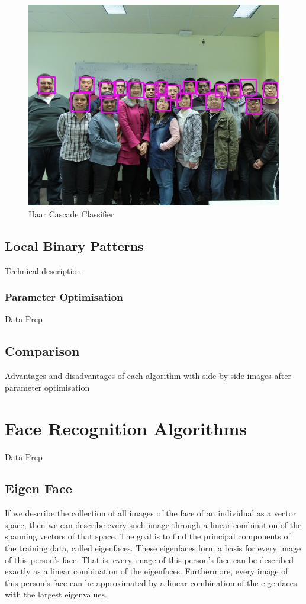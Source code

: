 \documentclass{article}
\begin{document}
\begin{figure}
\centering
\includegraphics[width=0.7\linewidth,natwidth=642,natheight=642]{waiting_room_detected.jpg}
\caption{Haar Cascade Classifier}
\label{fig:haar_cascade}
\end{figure}


\subsection{Local Binary Patterns}
Technical description
\subsubsection{Parameter Optimisation}
Data Prep

\subsection{Comparison}
Advantages and disadvantages of each algorithm with side-by-side images after parameter optimisation


\section{Face Recognition Algorithms}
Data Prep

\subsection{Eigen Face}
If we describe the collection of all images of the face of an individual as a vector space, then we can describe every such image through a linear combination of the spanning vectors of that space.
The goal is to find the principal components of the training data, called eigenfaces. These eigenfaces form a basis for every image of this person’s face. That is, every image of this person’s face can be described exactly as a linear combination of the eigenfaces. Furthermore, every image of this person’s face can be approximated by a linear combination of the eigenfaces with the largest eigenvalues.
\end{document}
